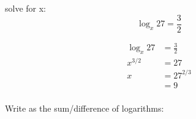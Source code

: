 \documentclass[fleqn,addpoints]{exam}
\begin{document}
\begin{questions}






    \question[5] solve for x:
      \[
        \log_x 27 = \frac{3}{2}
      \]

      \begin{solution}
        \begin{align*}
          \log_x 27 & = \frac{3}{2} \\
          x^{3/2}   & = 27 \\
          x         & = 27^{2/3} \\
                    & = \boxed{9} \\
        \end{align*}
      \end{solution}

    \question Write as the sum/difference of logarithms:
\end{questions}
\end{document}
